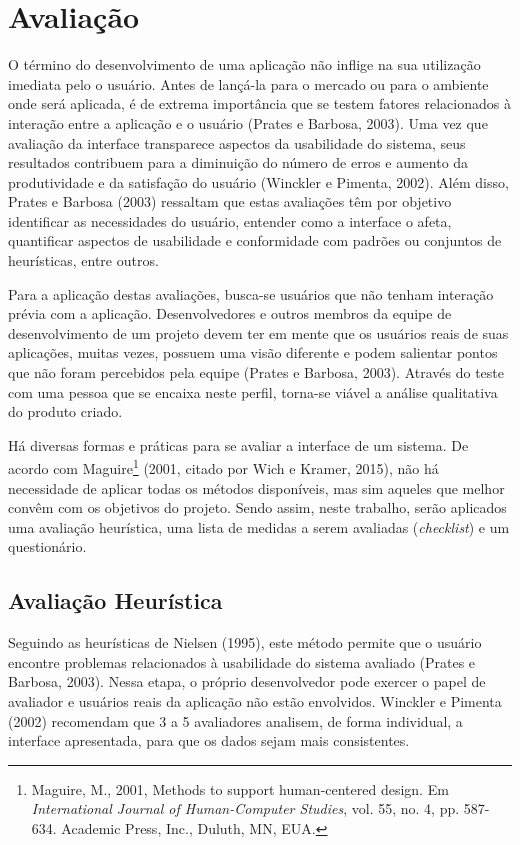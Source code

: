 \chapter{\label{chap:avaliacao}Avaliação}

O término do desenvolvimento de uma aplicação não inflige na sua utilização imediata pelo o usuário. Antes de lançá-la para o mercado ou para o ambiente onde será aplicada, é de extrema importância que se testem fatores relacionados à interação entre a aplicação e o usuário (Prates e Barbosa, 2003). Uma vez que avaliação da interface transparece aspectos da usabilidade do sistema, seus resultados contribuem para a diminuição do número de erros e aumento da produtividade e da satisfação do usuário (Winckler e Pimenta, 2002)\nocite{WINCKLER2002}. Além disso, Prates e Barbosa (2003) ressaltam que estas avaliações têm por objetivo identificar as necessidades do usuário, entender como a interface o afeta, quantificar aspectos de usabilidade e conformidade com padrões ou conjuntos de heurísticas, entre outros.

Para a aplicação destas avaliações, busca-se usuários que não tenham interação prévia com a aplicação. Desenvolvedores e outros membros da equipe de desenvolvimento de um projeto devem ter em mente que os usuários reais de suas aplicações, muitas vezes, possuem uma visão diferente e podem salientar pontos que não foram percebidos pela equipe (Prates e Barbosa, 2003). Através do teste com uma pessoa que se encaixa neste perfil, torna-se viável a análise qualitativa do produto criado.

Há diversas formas e práticas para se avaliar a interface de um sistema. De acordo com Maguire\footnote{Maguire, M., 2001, Methods to support human-centered design. Em \emph{International Journal of Human-Computer Studies}, vol. 55, no. 4, pp. 587-634. Academic Press, Inc., Duluth, MN, EUA.} (2001, citado por Wich e Kramer, 2015\nocite{WICH2015}), não há necessidade de aplicar todas os métodos disponíveis, mas sim aqueles que melhor convêm com os objetivos do projeto. Sendo assim, neste trabalho, serão aplicados uma avaliação heurística, uma lista de medidas a serem avaliadas (\emph{checklist}) e um questionário.

\section{Avaliação Heurística}

Seguindo as heurísticas de Nielsen (1995)\nocite{NIELSEN1995}, este método permite que o usuário encontre problemas relacionados à usabilidade do sistema avaliado (Prates e Barbosa, 2003). Nessa etapa, o próprio desenvolvedor pode exercer o papel de avaliador e usuários reais da aplicação não estão envolvidos. Winckler e Pimenta (2002) recomendam que 3 a 5 avaliadores analisem, de forma individual, a interface apresentada, para que os dados sejam mais consistentes.

